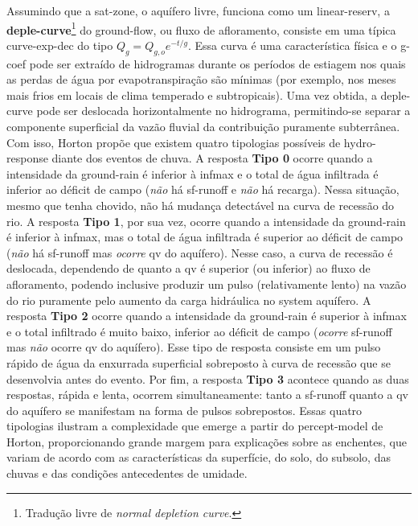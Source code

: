 \documentclass[./main.tex]{subfiles}
\begin{document}
\noindent Assumindo que a \gls{sat-zone}, o aquífero livre, funciona como um \gls{linear-reserv}, a \textbf{\gls{deple-curve}}\footnote{Tradução livre de \textit{normal depletion curve}.} do \gls{ground-flow}, ou fluxo de afloramento, consiste em uma típica \gls{curve-exp-dec} do tipo $Q_{g} = Q_{g, o} e^{-t/g}$. Essa curva é uma característica física e o \gls{g-coef} pode ser extraído de hidrogramas durante os períodos de estiagem nos quais as perdas de água por evapotranspiração são mínimas (por exemplo, nos meses mais frios em locais de clima temperado e subtropicais). Uma vez obtida, a \gls{deple-curve} pode ser deslocada horizontalmente no hidrograma, permitindo-se separar a componente superficial da vazão fluvial da contribuição puramente subterrânea. Com isso, Horton propõe que existem quatro  tipologias possíveis de \gls{hydro-response} diante dos eventos de chuva. A resposta \textbf{Tipo 0} ocorre quando a intensidade da \gls{ground-rain} é inferior à \gls{infmax} e o total de água infiltrada é inferior ao déficit de campo (\textit{não} há \gls{sf-runoff} e \textit{não} há recarga). Nessa situação, mesmo que tenha chovido, não há mudança detectável na curva de recessão do rio. A resposta \textbf{Tipo 1}, por sua vez, ocorre quando a intensidade da \gls{ground-rain} é inferior à \gls{infmax}, mas o total de água infiltrada é superior ao déficit de campo (\textit{não} há \gls{sf-runoff} mas \textit{ocorre} \gls{qv} do aquífero). Nesse caso, a curva de recessão é deslocada, dependendo de quanto a \gls{qv} é superior (ou inferior) ao fluxo de afloramento, podendo inclusive produzir um pulso (relativamente lento) na vazão do rio puramente pelo aumento da carga hidráulica no \gls{system} aquífero. A resposta \textbf{Tipo 2} ocorre quando a intensidade da \gls{ground-rain} é superior à \gls{infmax} e o total infiltrado é muito baixo, inferior ao déficit de campo (\textit{ocorre} \gls{sf-runoff} mas \textit{não} ocorre \gls{qv} do aquífero). Esse tipo de resposta consiste em um pulso rápido de água da enxurrada superficial sobreposto à curva de recessão que se desenvolvia antes do evento. Por fim, a resposta \textbf{Tipo 3} acontece quando as duas respostas, rápida e lenta, ocorrem simultaneamente: tanto a \gls{sf-runoff} quanto a \gls{qv} do aquífero se manifestam na forma de pulsos sobrepostos. Essas quatro tipologias ilustram a complexidade que emerge a partir do \gls{percept-model} de Horton, proporcionando grande margem para explicações sobre as enchentes, que variam de acordo com as características da superfície, do solo, do subsolo, das chuvas e das condições antecedentes de umidade.
\end{document}

